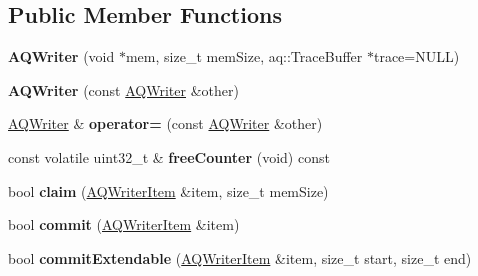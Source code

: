 \subsection*{Public Member Functions}
\begin{DoxyCompactItemize}
\item 
{\bfseries A\+Q\+Writer} (void $\ast$mem, size\+\_\+t mem\+Size, aq\+::\+Trace\+Buffer $\ast$trace=N\+U\+LL)\hypertarget{class_a_q_writer_af0b7130d88826565128ff5c52451d095}{}\label{class_a_q_writer_af0b7130d88826565128ff5c52451d095}

\item 
{\bfseries A\+Q\+Writer} (const \hyperlink{class_a_q_writer}{A\+Q\+Writer} \&other)\hypertarget{class_a_q_writer_adfec5d995bc6262d4381e630aae16bea}{}\label{class_a_q_writer_adfec5d995bc6262d4381e630aae16bea}

\item 
\hyperlink{class_a_q_writer}{A\+Q\+Writer} \& {\bfseries operator=} (const \hyperlink{class_a_q_writer}{A\+Q\+Writer} \&other)\hypertarget{class_a_q_writer_a4f1d7b7322b0e47b2573f2ba7da844ed}{}\label{class_a_q_writer_a4f1d7b7322b0e47b2573f2ba7da844ed}

\item 
const volatile uint32\+\_\+t \& {\bfseries free\+Counter} (void) const \hypertarget{class_a_q_writer_a6eb5b715a284fc141a8671ebee3bd293}{}\label{class_a_q_writer_a6eb5b715a284fc141a8671ebee3bd293}

\item 
bool {\bfseries claim} (\hyperlink{class_a_q_writer_item}{A\+Q\+Writer\+Item} \&item, size\+\_\+t mem\+Size)\hypertarget{class_a_q_writer_ae0e2eeac326abd648b6aa60a1fb5315a}{}\label{class_a_q_writer_ae0e2eeac326abd648b6aa60a1fb5315a}

\item 
bool {\bfseries commit} (\hyperlink{class_a_q_writer_item}{A\+Q\+Writer\+Item} \&item)\hypertarget{class_a_q_writer_a598bba1f79e007e038ab76d8939a5b56}{}\label{class_a_q_writer_a598bba1f79e007e038ab76d8939a5b56}

\item 
bool {\bfseries commit\+Extendable} (\hyperlink{class_a_q_writer_item}{A\+Q\+Writer\+Item} \&item, size\+\_\+t start, size\+\_\+t end)\hypertarget{class_a_q_writer_a74fddc416d47cac08b87a9032a8ca2ce}{}\label{class_a_q_writer_a74fddc416d47cac08b87a9032a8ca2ce}

\end{DoxyCompactItemize}
